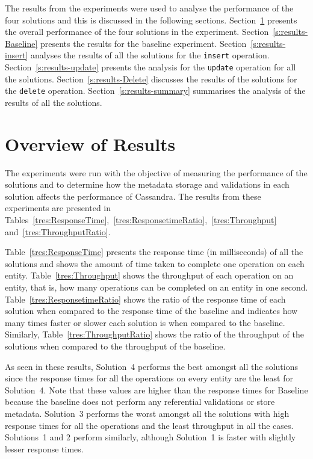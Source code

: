  The results from the experiments were used to
analyse the performance of the four solutions  and this is discussed in the
following sections.
Section~\ref{s:results-overview} presents the overall performance of the four
solutions in the experiment.
Section~\ref{s:results-Baseline} presents the results for the baseline
experiment.
Section~\ref{s:results-insert} analyses the results of all the solutions for the
\texttt{insert} operation.
Section~\ref{s:results-update} presents the analysis for the \texttt{update}
operation for all the solutions.
Section~\ref{s:results-Delete} discusses the results of the solutions for the
\texttt{delete} operation.
Section~\ref{s:results-summary} summarises the analysis of the results of all
the solutions.

\newcommand{\Width}{0.5\textwidth}
\newcommand{\TB}[1]{\textbf{#1}}

\section{Overview of Results} \label{s:results-overview}

The experiments were run with the objective of measuring the performance of the
solutions and to determine how the metadata storage and validations in each
solution affects the performance of Cassandra. The results from these
experiments are presented in
Tables~\ref{tres:ResponseTime},~\ref{tres:ResponsetimeRatio},~\ref{tres:Throughput}
and~\ref{tres:ThroughputRatio}. 

Table~\ref{tres:ResponseTime} presents the response time (in milliseconds) of
all the solutions and shows the amount of time taken to complete one operation
on each entity.
Table~\ref{tres:Throughput} shows the throughput of each operation on an entity,
that is, how many operations can be completed on an entity in one second.
Table~\ref{tres:ResponsetimeRatio} shows the ratio of the response time of each
solution when compared to the response time of the baseline and indicates
how many times faster or slower each solution is when compared to the baseline.
Similarly, Table~\ref{tres:ThroughputRatio} shows the ratio of the throughput of
the solutions when compared to the throughput of the baseline. 

As seen in these results, Solution~4 performs the best amongst all the solutions
since the response times for all the  operations on every entity are the least
for Solution~4. Note that these values are higher than the response times for
Baseline  because the baseline does not perform any referential
validations or store metadata. Solution~3 performs the worst amongst all the
solutions with high response times for all the operations and the least
throughput in all the cases. Solutions~1 and 2 perform similarly, although
Solution~1 is faster with slightly lesser response times.


